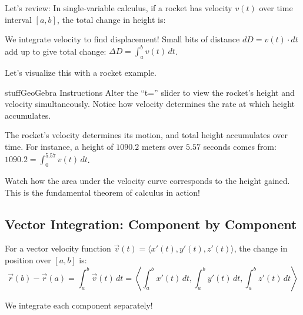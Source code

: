 \documentclass{ximera}
\begin{document}
\begin{problem}
Let's review: In single-variable calculus, if a rocket has velocity $v(t)$ over time interval $[a,b]$, the total change in height is:

\begin{multipleChoice}
\end{multipleChoice}

\begin{feedback}
We integrate velocity to find displacement! Small bits of distance $dD = v(t) \cdot dt$ add up to give total change: $\Delta D = \int_a^b v(t) \, dt$.
\end{feedback}
\end{problem}

\begin{problem}
Let's visualize this with a rocket example.

\begin{expandable}{stuff}{GeoGebra Instructions}
    Alter the ``t='' slider to view the rocket's height and velocity simultaneously. Notice how velocity determines the rate at which height accumulates.
\end{expandable}

\begin{center}
\end{center}

The rocket's velocity determines its motion, and total height accumulates over time. For instance, a height of $1090.2$ meters over $5.57$ seconds comes from: $1090.2 = \int_0^{5.57} v(t) \, dt$.

\begin{feedback}
Watch how the area under the velocity curve corresponds to the height gained. This is the fundamental theorem of calculus in action!
\end{feedback}
\end{problem}

\subsection*{Vector Integration: Component by Component}

\begin{definition}
For a vector velocity function $\vec{v}(t)=\langle x'(t), y'(t), z'(t)\rangle$, the change in position over $[a,b]$ is:
$$\vec{r}(b)-\vec{r}(a)= \int_a^b \vec{v}(t)\, dt=\left\langle \int_a^b x'(t)\, dt, \int_a^b y'(t)\, dt, \int_a^b z'(t)\, dt\right\rangle$$

We integrate each component separately!
\end{definition}
\end{document}
